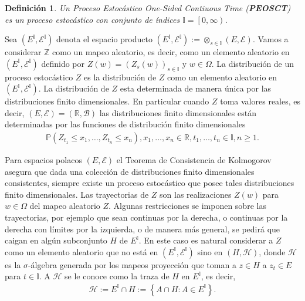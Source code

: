 \documentclass{article}
\newtheorem{Def}{Definición}
\newcommand{\prob}{\mathbb{P}}
\begin{document}
\begin{Def}
Un Proceso Estoc\'astico \textit{One-Sided Contiuous Time} (\textbf{PEOSCT}) es un proceso estoc\'astico con conjunto de \'indices $\mathbb{I}=\left[0,\infty\right)$.
\end{Def}

Sea $\left(E^{\mathbb{I}},\mathcal{E}^{\mathbb{I}}\right)$ denota el espacio producto $\left(E^{\mathbb{I}},\mathcal{E}^{\mathbb{I}}\right):=\otimes_{s\in\mathbb{I}}\left(E,\mathcal{E}\right)$. Vamos a considerar $\mathbb{Z}$ como un mapeo aleatorio, es decir, como un elemento aleatorio en $\left(E^{\mathbb{I}},\mathcal{E}^{\mathbb{I}}\right)$ definido por $Z\left(w\right)=\left(Z_{s}\left(w\right)\right)_{s\in\mathbb{I}}$ y $w\in\Omega$. La distribuci\'on de un proceso estoc\'astico $Z$ es la distribuci\'on de $Z$ como un elemento aleatorio en $\left(E^{\mathbb{I}},\mathcal{E}^{\mathbb{I}}\right)$. La distribuci\'on de $Z$ esta determinada de manera \'unica por las distribuciones finito dimensionales. En particular cuando $Z$ toma valores reales, es decir, $\left(E,\mathcal{E}\right)=\left(\mathbb{R},\mathcal{B}\right)$ las distribuciones finito dimensionales est\'an determinadas por las funciones de distribuci\'on finito dimensionales
\begin{eqnarray}
\prob\left(Z_{t_{1}}\leq x_{1},\ldots,Z_{t_{n}}\leq x_{n}\right),x_{1},\ldots,x_{n}\in\mathbb{R},t_{1},\ldots,t_{n}\in\mathbb{I},n\geq1.
\end{eqnarray}

Para espacios polacos $\left(E,\mathcal{E}\right)$ el Teorema de Consistencia de Kolmogorov asegura que dada una colecci\'on de distribuciones finito dimensionales consistentes, siempre existe un proceso estoc\'astico que posee tales distribuciones finito dimensionales. Las trayectorias de $Z$ son las realizaciones $Z\left(w\right)$ para $w\in\Omega$ del mapeo aleatorio $Z$. Algunas restricciones se imponen sobre las trayectorias, por ejemplo que sean continuas por la derecha, o continuas por la derecha con l\'imites por la izquierda, o de manera m\'as general, se pedir\'a que caigan en alg\'un subconjunto $H$ de $E^{\mathbb{I}}$. En este caso es natural considerar a $Z$ como un elemento aleatorio que no est\'a en $\left(E^{\mathbb{I}},\mathcal{E}^{\mathbb{I}}\right)$ sino en $\left(H,\mathcal{H}\right)$, donde $\mathcal{H}$ es la $\sigma$-\'algebra generada por los mapeos proyecci\'on que toman a $z\in H$ a $z_{t}\in E$ para $t\in\mathbb{I}$. A $\mathcal{H}$ se le conoce como la traza de $H$ en $E^{\mathbb{I}}$, es decir,
\begin{eqnarray}
\mathcal{H}:=E^{\mathbb{I}}\cap H:=\left\{A\cap H:A\in E^{\mathbb{I}}\right\}.
\end{eqnarray}
\end{document}
